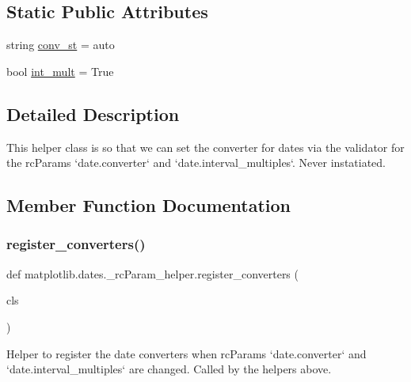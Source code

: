 \subsection*{Static Public Attributes}
\begin{DoxyCompactItemize}
\item 
string \hyperlink{classmatplotlib_1_1dates_1_1__rcParam__helper_aa854e476e9cbe0509e4b7f32240085d3}{conv\+\_\+st} = \textquotesingle{}auto\textquotesingle{}
\item 
bool \hyperlink{classmatplotlib_1_1dates_1_1__rcParam__helper_a2d0b53418e2c29e1c9b1aecc822ab0ed}{int\+\_\+mult} = True
\end{DoxyCompactItemize}


\subsection{Detailed Description}
\begin{DoxyVerb}This helper class is so that we can set the converter for dates
via the validator for the rcParams `date.converter` and
`date.interval_multiples`.  Never instatiated.
\end{DoxyVerb}
 

\subsection{Member Function Documentation}
\mbox{\label{classmatplotlib_1_1dates_1_1__rcParam__helper_a91a32fcafabc32786502b84ba6fc551b}} 
\subsubsection{\texorpdfstring{register\+\_\+converters()}{register\_converters()}}
{\footnotesize\ttfamily def matplotlib.\+dates.\+\_\+rc\+Param\+\_\+helper.\+register\+\_\+converters (\begin{DoxyParamCaption}\item[{}]{cls }\end{DoxyParamCaption})}

\begin{DoxyVerb}Helper to register the date converters when rcParams `date.converter`
and `date.interval_multiples` are changed.  Called by the helpers
above.
\end{DoxyVerb}
 \mbox{\label{classmatplotlib_1_1dates_1_1__rcParam__helper_aa015b257d7d97f5ba6202d80f83df446}} 
